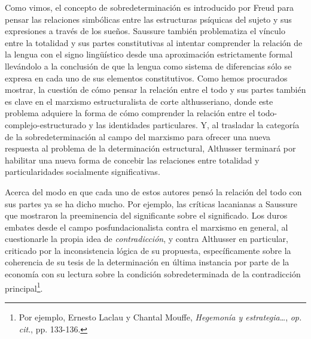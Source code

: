\documentclass{book}
\begin{document}
Como vimos, el concepto de sobredeterminación es introducido por Freud
para pensar las relaciones simbólicas entre las estructuras psíquicas
del sujeto y sus expresiones a través de los sueños. Saussure también
problematiza el vínculo entre la totalidad y sus partes constitutivas al
intentar comprender la relación de la lengua con el signo lingüístico
desde una aproximación estrictamente formal llevándolo a la conclusión
de que la lengua como sistema de diferencias sólo se expresa en cada uno
de sus elementos constitutivos. Como hemos procurados mostrar, la
cuestión de cómo pensar la relación entre el todo y sus partes también
es clave en el marxismo estructuralista de corte althusseriano, donde
este problema adquiere la forma de cómo comprender la relación entre el
todo-complejo-estructurado y las identidades particulares. Y, al
trasladar la categoría de la sobredeterminación al campo del marxismo
para ofrecer una nueva respuesta al problema de la determinación
estructural, Althusser terminará por habilitar una nueva forma de
concebir las relaciones entre totalidad y particularidades socialmente
significativas.

Acerca del modo en que cada uno de estos autores pensó la relación del
todo con sus partes ya se ha dicho mucho. Por ejemplo, las críticas
lacanianas a Saussure que mostraron la preeminencia del significante
sobre el significado. Los duros embates desde el campo
posfundacionalista contra el marxismo en general, al cuestionarle la
propia idea de \emph{contradicción}, y contra Althusser en particular,
criticado por la inconsistencia lógica de su propuesta, específicamente
sobre la coherencia de su tesis de la determinación en última instancia
por parte de la economía con su lectura sobre la condición
sobredeterminada de la contradicción principal\footnote{Por ejemplo,
  Ernesto Laclau y Chantal Mouffe, \emph{Hegemonía y estrategia}\ldots,
  \emph{op. cit}., pp. 133-136.}.
\end{document}
